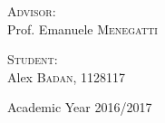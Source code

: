 \begin{center}
  \begin{minipage}[t]{0.49\textwidth}
    \flushleft
    \textsc{\large{Advisor:}} \\ \large{Prof. Emanuele \textsc{Menegatti}}\\
  \end{minipage}
  \hfill
  \begin{minipage}[t]{0.49\textwidth}
    \flushright
    \textsc{\large{Student:}} \\ \large{Alex \textsc{Badan}, 1128117} \\
  \end{minipage}
  
  \vspace*{\fill}
  \large{Academic Year 2016/2017}
\end{center}
